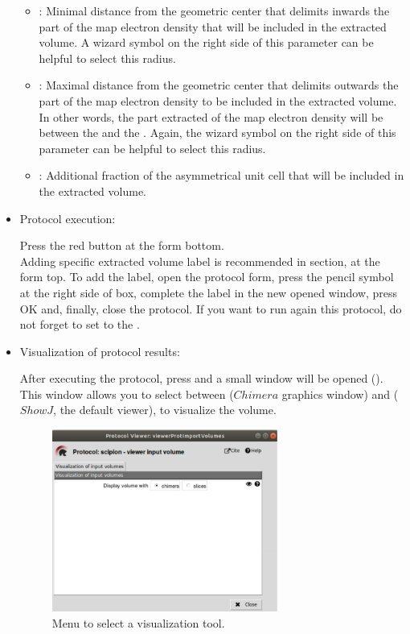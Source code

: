 \begin{itemize}
\begin{itemize}
  \item {}: Minimal distance from the geometric center that delimits inwards the part of the map electron density that will be included in the extracted volume. A wizard symbol on the right side of this parameter can be helpful to select this radius.
  \item {}: Maximal distance from the geometric center that delimits outwards the part of the map electron density to be included in the extracted volume. In other words, the part extracted of the map electron density will be between the  and the . Again, the wizard symbol on the right side of this parameter can be helpful to select this radius.  
  \item {}: Additional fraction of the asymmetrical unit cell that will be included in the extracted volume.
  \end{itemize}

  \item Protocol execution:
  
  Press the  red button at the form bottom.\\
  Adding specific extracted volume label is recommended in  section, at the form top. To add the label, open the protocol form, press the pencil symbol at the right side of  box, complete the label in the new opened window, press OK and, finally, close the protocol. If you want to run again this protocol, do not forget to set to  the .
  
  \item Visualization of protocol results:
  
  After executing the protocol, press  and a small window will be opened (). This window allows you to select between  ($Chimera$ graphics window) and  ($ShowJ$, the default \scipion viewer), to visualize the volume.
  
    \begin{figure}[H]
    \centering 
    \captionsetup{width=.7\linewidth} 
    \includegraphics[width=0.70\textwidth]{Images_appendix/Fig101.pdf}
    \caption{Menu to select a visualization tool.}
    \label{fig:app_protocol_volume_2}
   \end{figure}
   

\end{itemize}
